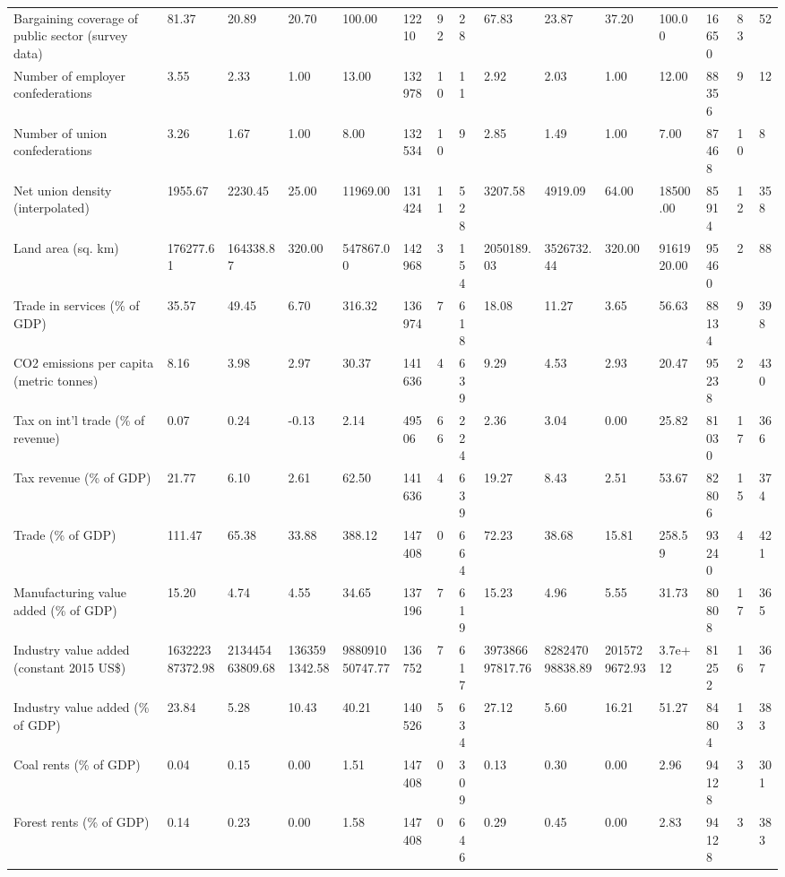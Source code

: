 \begin{longtable}{lllllllllllllll}
\addlinespace
Bargaining coverage of public sector (survey data) & 81.37 & 20.89 & 20.70 & 100.00 & 12210 & 92 & 28 & 67.83 & 23.87 & 37.20 & 100.00 & 16650 & 83 & 52\\
Number of employer confederations & 3.55 & 2.33 & 1.00 & 13.00 & 132978 & 10 & 11 & 2.92 & 2.03 & 1.00 & 12.00 & 88356 & 9 & 12\\
Number of union confederations & 3.26 & 1.67 & 1.00 & 8.00 & 132534 & 10 & 9 & 2.85 & 1.49 & 1.00 & 7.00 & 87468 & 10 & 8\\
Net union density (interpolated) & 1955.67 & 2230.45 & 25.00 & 11969.00 & 131424 & 11 & 528 & 3207.58 & 4919.09 & 64.00 & 18500.00 & 85914 & 12 & 358\\
Land area (sq. km) & 176277.61 & 164338.87 & 320.00 & 547867.00 & 142968 & 3 & 154 & 2050189.03 & 3526732.44 & 320.00 & 9161920.00 & 95460 & 2 & 88\\
\addlinespace
Trade in services (\% of GDP) & 35.57 & 49.45 & 6.70 & 316.32 & 136974 & 7 & 618 & 18.08 & 11.27 & 3.65 & 56.63 & 88134 & 9 & 398\\
CO2 emissions per capita (metric tonnes) & 8.16 & 3.98 & 2.97 & 30.37 & 141636 & 4 & 639 & 9.29 & 4.53 & 2.93 & 20.47 & 95238 & 2 & 430\\
Tax on int'l trade (\% of revenue) & 0.07 & 0.24 & -0.13 & 2.14 & 49506 & 66 & 224 & 2.36 & 3.04 & 0.00 & 25.82 & 81030 & 17 & 366\\
Tax revenue (\% of GDP) & 21.77 & 6.10 & 2.61 & 62.50 & 141636 & 4 & 639 & 19.27 & 8.43 & 2.51 & 53.67 & 82806 & 15 & 374\\
Trade (\% of GDP) & 111.47 & 65.38 & 33.88 & 388.12 & 147408 & 0 & 664 & 72.23 & 38.68 & 15.81 & 258.59 & 93240 & 4 & 421\\
\addlinespace
Manufacturing value added (\% of GDP) & 15.20 & 4.74 & 4.55 & 34.65 & 137196 & 7 & 619 & 15.23 & 4.96 & 5.55 & 31.73 & 80808 & 17 & 365\\
Industry value added (constant 2015 US\$) & 163222387372.98 & 213445463809.68 & 1363591342.58 & 988091050747.77 & 136752 & 7 & 617 & 397386697817.76 & 828247098838.89 & 2015729672.93 & 3.7e+12 & 81252 & 16 & 367\\
Industry value added (\% of GDP) & 23.84 & 5.28 & 10.43 & 40.21 & 140526 & 5 & 634 & 27.12 & 5.60 & 16.21 & 51.27 & 84804 & 13 & 383\\
Coal rents (\% of GDP) & 0.04 & 0.15 & 0.00 & 1.51 & 147408 & 0 & 309 & 0.13 & 0.30 & 0.00 & 2.96 & 94128 & 3 & 301\\
Forest rents (\% of GDP) & 0.14 & 0.23 & 0.00 & 1.58 & 147408 & 0 & 646 & 0.29 & 0.45 & 0.00 & 2.83 & 94128 & 3 & 383\\

\end{longtable}
